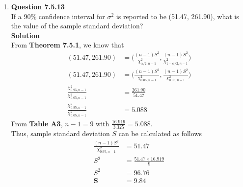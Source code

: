 \documentclass{uofa-eng-assignment}
\begin{document}
\begin{enumerate}
    \item[]
        \textbf{Question 7.5.13} \\
        If a $90\%$ confidence interval for $\sigma^2$ is reported to be (51.47, 261.90),
        what is the value of the sample standard deviation? \\
        \textbf{Solution} \\
        From \textbf{Theorem 7.5.1}, we know that
        \begin{align*}
            (51.47, 261.90)                             & = \Big( \frac{(n-1)S^2}{\chi^2_{\alpha/2, n-1}}, \frac{(n-1)S^2}{\chi^2_{1-\alpha/2, n-1}} \Big) \\
            (51.47, 261.90)                             & = \Big( \frac{(n-1)S^2}{\chi^2_{0.05, n-1}}, \frac{(n-1)S^2}{\chi^2_{0.95, n-1}} \Big)           \\
            \frac{\chi^2_{0.95,n-1}}{\chi^2_{0.05,n-1}} & = \frac{261.90}{51.47}                                                                           \\
            \frac{\chi^2_{0.95,n-1}}{\chi^2_{0.05,n-1}} & = 5.088
        \end{align*}
        From \textbf{Table A3}, $n - 1 = 9$ with $\frac{16.919}{3.325} = 5.088$. \\
        Thus, sample standard deviation $S$ can be calculated as follows
        \begin{align*}
            \frac{(n-1)S^2}{\chi^2_{0.95, n-1}} & = 51.47                         \\
            S^2                                 & = \frac{51.47 \times 16.919}{9} \\
            S^2                                 & = 96.76                         \\
            \boldsymbol{S}                      & \boldsymbol{= 9.84}
        \end{align*}

\end{enumerate}
\end{document}

